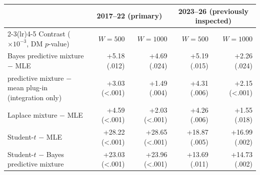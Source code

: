 \begin{tabular}{lrrrr}\toprule
 & \multicolumn{2}{c}{2017--22 (primary)} & \multicolumn{2}{c}{2023--26 (previously inspected)}\\\cmidrule(lr){2-3}\cmidrule(lr){4-5}
Contrast ($\times10^{-3}$, DM $p$-value) & $W{=}500$ & $W{=}1000$ & $W{=}500$ & $W{=}1000$\\\midrule
Bayes predictive mixture $-$ MLE & +5.18 (.012) & +4.69 (.024) & +5.19 (.015) & +2.26 (.024) \\
predictive mixture $-$ mean plug-in (integration only) & +3.03 (<.001) & +1.49 (.004) & +4.31 (.006) & +2.15 (<.001) \\
Laplace mixture $-$ MLE & +4.59 (<.001) & +2.03 (<.001) & +4.26 (.006) & +1.55 (.018) \\
Student-$t$ $-$ MLE & +28.22 (<.001) & +28.65 (<.001) & +18.87 (.005) & +16.99 (.002) \\
Student-$t$ $-$ Bayes predictive mixture & +23.03 (<.001) & +23.96 (<.001) & +13.69 (.011) & +14.73 (.002) \\
\bottomrule\end{tabular}
